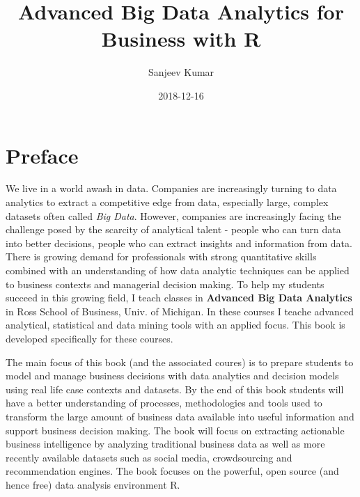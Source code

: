 \documentclass[]{krantz}
\title{Advanced Big Data Analytics for Business with R}
\author{Sanjeev Kumar}
\date{2018-12-16}
\theoremstyle{definition}
\theoremstyle{definition}
\theoremstyle{definition}
\theoremstyle{remark}
\begin{document}
\maketitle


\thispagestyle{empty}

\begin{center}

\par{}

\end{center}

\setlength{\abovedisplayskip}{-5pt}
\setlength{\abovedisplayshortskip}{-5pt}

{
\hypersetup{linkcolor=black}
\setcounter{tocdepth}{2}
\tableofcontents
}
\listoftables
\listoffigures
\chapter*{Preface}\label{preface}


We live in a world awash in data. Companies are increasingly turning to
data analytics to extract a competitive edge from data, especially
large, complex datasets often called \emph{Big Data}. However, companies
are increasingly facing the challenge posed by the scarcity of
analytical talent - people who can turn data into better decisions,
people who can extract insights and information from data. There is
growing demand for professionals with strong quantitative skills
combined with an understanding of how data analytic techniques can be
applied to business contexts and managerial decision making. To help my
students succeed in this growing field, I teach classes in
\textbf{Advanced Big Data Analytics} in Ross School of Business, Univ.
of Michigan. In these courses I teache advanced analytical, statistical
and data mining tools with an applied focus. This book is developed
specifically for these courses.

The main focus of this book (and the associated coures) is to prepare
students to model and manage business decisions with data analytics and
decision models using real life case contexts and datasets. By the end
of this book students will have a better understanding of processes,
methodologies and tools used to transform the large amount of business
data available into useful information and support business decision
making. The book will focus on extracting actionable business
intelligence by analyzing traditional business data as well as more
recently available datasets such as social media, crowdsourcing and
recommendation engines. The book focuses on the powerful, open source
(and hence free) data analysis environment R.
\end{document}
